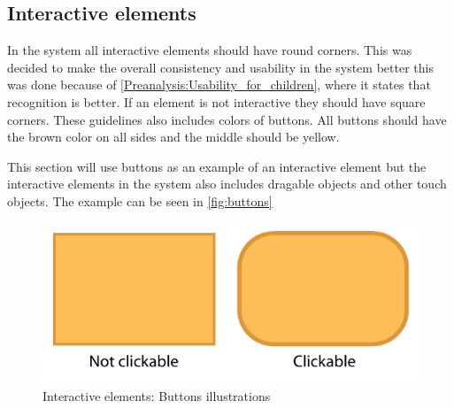 \subsection{Interactive elements}
\label{design:button_design}

In the \giraf[] system all interactive elements should have round corners. This was decided to make the overall consistency and usability in the \giraf[] system better this was done because of \autoref{Preanalysis:Usability_for_children}, where it states that recognition is better.
If an element is not interactive they should have square corners.
These guidelines also includes colors of buttons. All buttons should have the brown color on all sides and the middle should be yellow.

This section will use buttons as an example of an interactive element but the interactive elements in the \giraf[] system also includes dragable objects and other touch objects. The example can be seen in \autoref{fig:buttons}

\begin{figure}[h!]
	\centering
	\includegraphics[width=\textwidth]{gfx/buttons.pdf}
	\caption{Interactive elements: Buttons illustrations}
	\label{fig:buttons}
\end{figure}